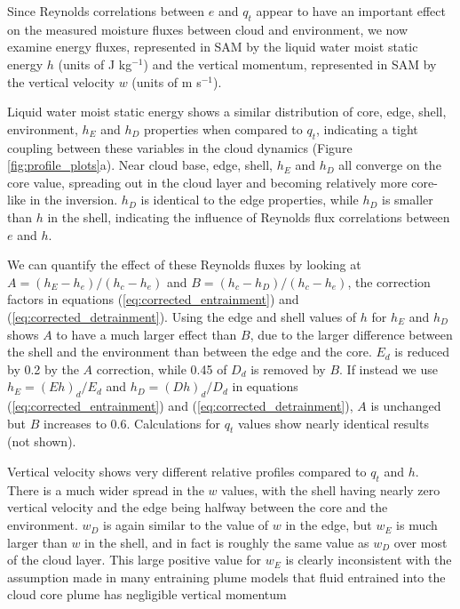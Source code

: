 \documentclass[12pt]{article}
\begin{document}
Since Reynolds correlations between $e$ and $q_t$ appear to have an important 
effect on the measured moisture fluxes between cloud and environment, we now 
examine energy fluxes, represented in SAM by the liquid water moist static 
energy $h$ (units of J kg$^{-1}$) and the vertical momentum, represented in SAM 
by the vertical velocity $w$ (units of m s$^{-1}$).

Liquid water moist static energy shows a similar distribution of core, edge, 
shell, environment, $h_E$ and $h_D$ properties when compared to $q_t$, 
indicating a tight coupling between these variables in the cloud dynamics 
(Figure \ref{fig:profile_plots}a).  Near cloud base, edge, shell, $h_E$ and 
$h_D$ all converge on the core value, spreading out in the cloud layer and 
becoming relatively more core-like in the inversion.  $h_D$ is identical to the 
edge properties, while $h_D$ is smaller than $h$ in the shell, indicating the 
influence of Reynolds flux correlations between $e$ and $h$.

We can quantify the effect of these Reynolds fluxes by looking at 
$A = (h_E - h_e)/(h_c - h_e)$ and $B = (h_c - h_D)/(h_c - h_e)$, the correction 
factors in equations (\ref{eq:corrected_entrainment}) and 
(\ref{eq:corrected_detrainment}).  Using the edge and shell values of $h$ for 
$h_E$ and $h_D$ shows $A$ to have a much larger effect than $B$, due to the 
larger difference between the shell and the environment than between the edge 
and the core.  $E_d$ is reduced by 0.2 by the $A$ correction, while 0.45 of
$D_d$ is removed by $B$.  If instead we use $h_E = (E h)_d/E_d$ and 
$h_D = (D h)_d/D_d$ in equations (\ref{eq:corrected_entrainment}) and 
(\ref{eq:corrected_detrainment}), $A$ is unchanged but $B$ increases to 0.6.  
Calculations for $q_t$ values show nearly identical results (not shown).

Vertical velocity shows very different relative profiles compared to
$q_t$ and $h$.  There is a much wider spread in the $w$ values,
with the shell having nearly zero vertical velocity and the edge being
halfway between the core and the environment.  $w_D$ is again similar
to the value of $w$ in the edge, but $w_E$ is much larger than $w$ in
the shell, and in fact is roughly the same value as $w_D$ over most of
the cloud layer.  This large positive value for $w_E$ is clearly inconsistent
with the assumption made in many entraining plume models that 
fluid entrained into the cloud core plume has negligible vertical momentum
\citep{Simpson1969,Gregory2001,Siebesma2003}
\end{document}
